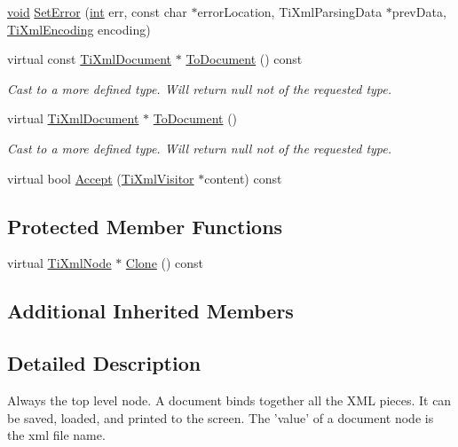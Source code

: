 \begin{DoxyCompactItemize}
\hyperlink{wglew_8h_aeea6e3dfae3acf232096f57d2d57f084}{void} \hyperlink{class_ti_xml_document_a735c23e318597b920c94eae77fa206de}{Set\-Error} (\hyperlink{wglew_8h_a500a82aecba06f4550f6849b8099ca21}{int} err, const char $\ast$error\-Location, Ti\-Xml\-Parsing\-Data $\ast$prev\-Data, \hyperlink{tinyxml_8h_a88d51847a13ee0f4b4d320d03d2c4d96}{Ti\-Xml\-Encoding} encoding)
\item 
virtual const \hyperlink{class_ti_xml_document}{Ti\-Xml\-Document} $\ast$ \hyperlink{class_ti_xml_document_a1dc977bde3e4fe85a8eb9d88a35ef5a4}{To\-Document} () const 
\begin{DoxyCompactList}\small\item\em Cast to a more defined type. Will return null not of the requested type. \end{DoxyCompactList}\item 
virtual \hyperlink{class_ti_xml_document}{Ti\-Xml\-Document} $\ast$ \hyperlink{class_ti_xml_document_a1025d942a1f328fd742d545e37efdd42}{To\-Document} ()
\begin{DoxyCompactList}\small\item\em Cast to a more defined type. Will return null not of the requested type. \end{DoxyCompactList}\item 
virtual bool \hyperlink{class_ti_xml_document_aa545aae325d9752ad64120bc4ecf939a}{Accept} (\hyperlink{class_ti_xml_visitor}{Ti\-Xml\-Visitor} $\ast$content) const 
\end{DoxyCompactItemize}
\subsection*{Protected Member Functions}
\begin{DoxyCompactItemize}
\item 
virtual \hyperlink{class_ti_xml_node}{Ti\-Xml\-Node} $\ast$ \hyperlink{class_ti_xml_document_a4968661cab4a1f44a23329c6f8db1907}{Clone} () const 
\end{DoxyCompactItemize}
\subsection*{Additional Inherited Members}


\subsection{Detailed Description}
Always the top level node. A document binds together all the X\-M\-L pieces. It can be saved, loaded, and printed to the screen. The 'value' of a document node is the xml file name. 

